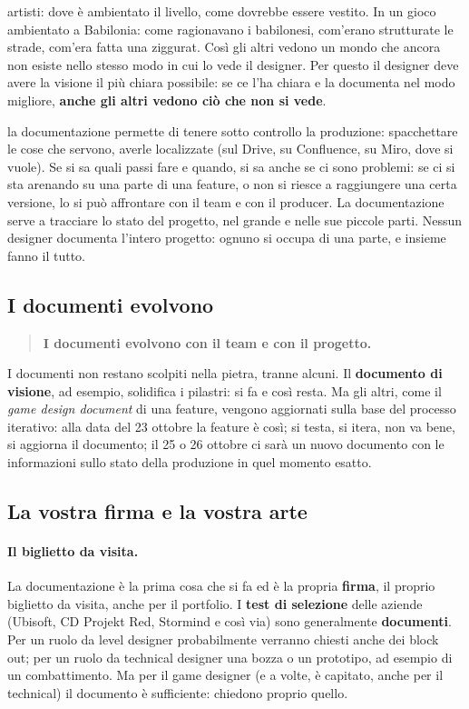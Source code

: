 \begin{description}
        artisti: dove è ambientato il livello, come dovrebbe essere vestito.
        In un gioco ambientato a Babilonia: come ragionavano i babilonesi,
        com'erano strutturate le strade, com'era fatta una ziggurat. Così gli
        altri vedono un mondo che ancora non esiste nello stesso modo in cui
        lo vede il designer. Per questo il designer deve avere la visione il
        più chiara possibile: se ce l'ha chiara e la documenta nel modo
        migliore, \textbf{anche gli altri vedono ciò che non si vede}.
  \item[Controllo] la documentazione permette di tenere sotto controllo la
        produzione: spacchettare le cose che servono, averle localizzate (sul
        Drive, su Confluence, su Miro, dove si vuole). Se si sa quali passi
        fare e quando, si sa anche se ci sono problemi: se ci si sta arenando
        su una parte di una feature, o non si riesce a raggiungere una certa
        versione, lo si può affrontare con il team e con il producer. La
        documentazione serve a tracciare lo stato del progetto, nel grande e
        nelle sue piccole parti. Nessun designer documenta l'intero progetto:
        ognuno si occupa di una parte, e insieme fanno il tutto.
\end{description}

\subsection{I documenti evolvono}

\begin{quote}
\centering
\textbf{I documenti evolvono con il team e con il progetto.}
\end{quote}
I documenti non restano scolpiti nella pietra, tranne alcuni. Il
\textbf{documento di visione}, ad esempio, solidifica i pilastri: si fa e
così resta. Ma gli altri, come il \emph{game design document} di una feature,
vengono aggiornati sulla base del processo iterativo: alla data del 23
ottobre la feature è così; si testa, si itera, non va bene, si aggiorna il
documento; il 25 o 26 ottobre ci sarà un nuovo documento con le informazioni
sullo stato della produzione in quel momento esatto.

\subsection{La vostra firma e la vostra arte}

\paragraph{Il biglietto da visita.} La documentazione è la prima cosa che si
fa ed è la propria \textbf{firma}, il proprio biglietto da visita, anche per
il portfolio. I \textbf{test di selezione} delle aziende (Ubisoft, CD Projekt
Red, Stormind e così via) sono generalmente \textbf{documenti}. Per un ruolo
da level designer probabilmente verranno chiesti anche dei block out; per un
ruolo da technical designer una bozza o un prototipo, ad esempio di un
combattimento. Ma per il game designer (e a volte, è capitato, anche per il
technical) il documento è sufficiente: chiedono proprio quello.

